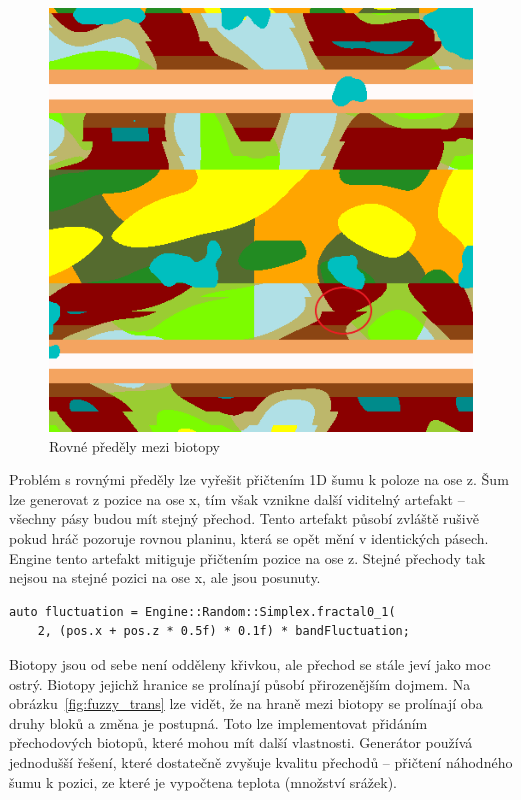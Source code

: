 \documentclass[thesis=M,czech]{FITthesis}[2019/12/23]
\begin{document}
\begin{figure}\centering
	\includegraphics[width=\textwidth]{images/world_gen/biomes_old}
	\caption[Rovné předěly mezi biotopy]{Rovné předěly mezi biotopy}\label{fig:biomes_old}
\end{figure}

Problém s rovnými předěly lze vyřešit přičtením 1D šumu k poloze na ose z. Šum lze generovat z pozice na ose x, tím však vznikne další viditelný artefakt – všechny pásy budou mít stejný přechod. Tento artefakt působí zvláště rušivě pokud hráč pozoruje rovnou planinu, která se opět mění v identických pásech. Engine tento artefakt mitiguje přičtením pozice na ose z. Stejné přechody tak nejsou na stejné pozici na ose x, ale jsou posunuty.

\begin{verbatim}
auto fluctuation = Engine::Random::Simplex.fractal0_1(
    2, (pos.x + pos.z * 0.5f) * 0.1f) * bandFluctuation;
\end{verbatim}

Biotopy jsou od sebe není odděleny křivkou, ale přechod se stále jeví jako moc ostrý. Biotopy jejichž hranice se prolínají působí přirozenějším dojmem. Na obrázku~\ref{fig:fuzzy_trans} lze vidět, že na hraně mezi biotopy se prolínají oba druhy bloků a změna je postupná. Toto lze implementovat přidáním přechodových biotopů, které mohou mít další vlastnosti. Generátor používá jednodušší řešení, které dostatečně zvyšuje kvalitu přechodů – přičtení náhodného šumu k pozici, ze které je vypočtena teplota (množství srážek).
\end{document}

